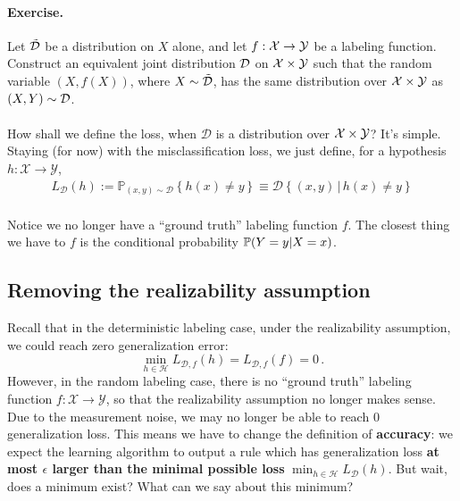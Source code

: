 \documentclass[11pt]{article}
\newcommand{\Prob}{\ensuremath{\mathbb{P}}}
\newcommand{\Dc}{\mathcal{D}}
\newcommand{\Xc}{\mathcal{X}}
\newcommand{\Yc}{\mathcal{Y}}
\newcommand{\Hc}{\mathcal{H}}
\begin{document}
  
\paragraph{Exercise.} Let $\tilde{\mathcal{D}}$ be a distribution on $X$ alone, and let
$f:\mathcal{X}\to\mathcal{Y}$ be a labeling function. Construct an equivalent joint distribution
$\mathcal{D}$ on $\mathcal{X}\times\mathcal{Y}$ such that the random variable $(X,f(X))$, where
$X\sim\tilde{\mathcal{D}}$, has the same distribution over $\mathcal{X}\times\mathcal{Y}$ as $(X,Y)\sim\mathcal{D}$. 
%
\\~\\
How shall we define the loss, when $\Dc$ is a distribution over $\mathcal{X}\times \mathcal{Y}$?
It's simple. Staying (for now) with the misclassification loss, we just define,
for a hypothesis $h:\Xc\to\Yc$,
    \begin{eqnarray} \label{L:def}
        L_\Dc(h) := \Prob_{(x,y)\sim\Dc}\left\{ h(x)\neq y \right\}
        \equiv \Dc\left\{ (x,y)\,|\, h(x)\neq y \right\}
    \end{eqnarray}
    ~\\
    Notice we no longer have a ``ground truth'' labeling function $f$. The
    closest thing we have to $f$  is the conditional probability
    $\operatorname*{\mathbb{P}}(Y=y|X=x)$.




\subsection{Removing the realizability assumption}

Recall that in the deterministic labeling case, under the realizability
assumption, we could reach zero generalization error:
\[
    \min_{h\in\Hc} L_{\Dc,f}(h) = L_{\Dc,f}(f)=0\,.
\]
However, in the random labeling case, there is no ``ground truth'' labeling function $f:\Xc\to\Yc$, so
that the realizability assumption no longer makes sense. Due to the measurement
noise, we may no longer be able to reach $0$ generalization loss. This means we
have to change the definition of {\bf accuracy}: we expect the learning
algorithm to output a rule which has generalization loss {\bf at most $\epsilon$
larger than the
minimal possible loss} $\min_{h\in\Hc} L_\Dc(h)$. 
But wait, does a minimum exist? What can we say about this minimum?

\end{document}
